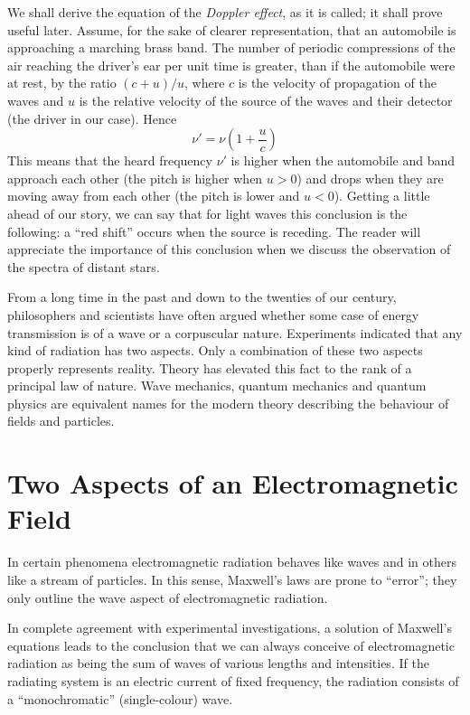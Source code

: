 We shall derive the equation of the \emph{Doppler effect}, as it is called; it shall prove useful later. Assume, for the sake of clearer representation, that an automobile is approaching a marching brass band. The number of periodic compressions of the air reaching the driver's ear per unit time is greater, than if the automobile were at rest, by the ratio $(c+u)/u$, where $c$ is the velocity of propagation of the waves and $u$ is the relative velocity of the source of the waves and their detector (the driver in our case). Hence
\begin{equation*}%
\nu' = \nu \left( 1 + \frac{u}{c} \right)
\end{equation*}
This means that the heard frequency $\nu'$ is higher when the automobile and band approach each other (the pitch is higher when $u > 0$) and drops when they are moving away from each other (the pitch is lower and $u<0$). Getting a little ahead of our story, we can say that for light waves this conclusion is the following: a ``red shift'' occurs when the source is receding. The reader will appreciate the importance of this conclusion when we discuss the observation of the spectra of distant stars.

From a long time in the past and down to the twenties of our century, philosophers and scientists have often argued whether some case of energy transmission is of a wave or a corpuscular nature. Experiments indicated that any kind of radiation has two aspects. Only a combination of these two aspects properly represents reality. Theory has elevated this fact to the rank of a principal law of nature. Wave mechanics, quantum mechanics and quantum physics are equivalent names for the modern theory describing the behaviour of fields and particles.


\section{Two Aspects of an Electromagnetic Field}

In certain phenomena electromagnetic radiation behaves like waves and in others like a stream of particles. In this sense, Maxwell's laws are prone to ``error''; they only outline the wave aspect of electromagnetic radiation.


In complete agreement with experimental investigations, a solution of Maxwell's equations leads to the conclusion that we can always conceive of electromagnetic radiation as being the sum of waves of various lengths and intensities. If the radiating system is an electric current of fixed frequency, the radiation consists of a ``monochromatic'' (single-colour) wave.



